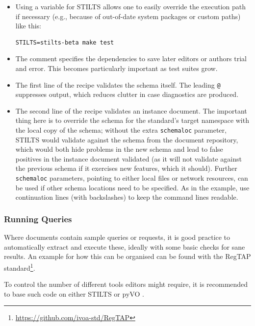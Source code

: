 \documentclass[11pt,a4paper]{ivoa}
\begin{document}
\begin{itemize}
\item Using a variable for STILTS allows one to easily override the
execution path if necessary (e.g., because of out-of-date system
packages or custom paths) like this:

\begin{lstlisting}
STILTS=stilts-beta make test
\end{lstlisting}

\item The comment specifies the dependencies to save later editors or
authors trial and error.  This becomes particularly important as test
suites grow.

\item The first line of the recipe validates the schema itself.  The
leading \verb|@| suppresses output, which reduces clutter in case
diagnostics are produced.

\item The second line of the recipe validates an instance document.  The
important thing here is to override the schema for the standard's target
namespace with the local copy of the schema; without the extra
\verb|schemaloc| parameter, STILTS would validate against the schema
from the document repository, which would both hide problems in the new
schema and lead to false positives in the instance document validated
(as it will not validate against the previous schema if it exercises new
features, which it should).  Further \verb|schemaloc| parameters,
pointing to either local files or network resources,
can be used if other schema locations need to be specified.
As in the example, use continuation lines (with backslashes)
to keep the command lines readable.

\end{itemize}

\subsubsection{Running Queries}

Where documents contain sample queries or requests, it is good practice
to automatically extract and execute these, ideally with some basic
checks for sane results.  An example for how this can be organised can
be found with the RegTAP
standard\footnote{\url{https://github.com/ivoa-std/RegTAP}}.

To control the number of different tools editors might require, it
is recommended to base such code on either STILTS or pyVO
\citep{2014ascl.soft02004G}.
\end{document}
